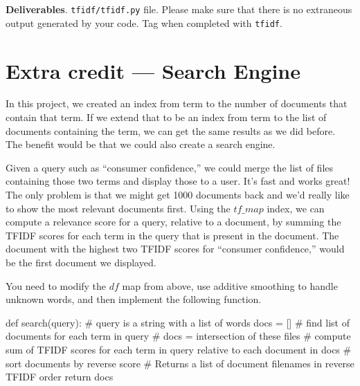 \begin{fullwidth}
\begin{callout}{\bcplume}
{\bf Deliverables}.   {\tt tfidf/tfidf.py} file. Please make sure that there is no extraneous output generated by your code. Tag when completed with {\tt tfidf}.
\end{callout}

\section{Extra credit --- Search Engine}

In this project, we created an index from term to the number of documents that contain that term. If we extend that to be an index from term to the list of documents containing the term, we can get the same results as we did before. The benefit would be that we could also create a search engine.

Given a query such as ``consumer confidence,'' we could merge the list of files containing those two terms and display those to a user. It's fast and works great! The only problem is that we might get 1000 documents back and we'd really like to show the most relevant documents first.  Using the $tf\_map$ index, we can compute a relevance score for a query, relative to a document, by summing the TFIDF scores for each term in the query that is present in the document. The document with the highest two TFIDF scores for ``consumer confidence,'' would be the first document we displayed.

You need to modify the $df$ map from above, use additive smoothing to handle unknown words, and then implement the following function.

\begin{pyverbatim}
def search(query): # query is a string with a list of words
    docs = []
    # find list of documents for each term in query
    # docs = intersection of these files
    # compute sum of TFIDF scores for each term in query relative to each document in docs
    # sort documents by reverse score
    # Returns a list of document filenames in reverse TFIDF order
    return docs
\end{pyverbatim}

\end{fullwidth}

